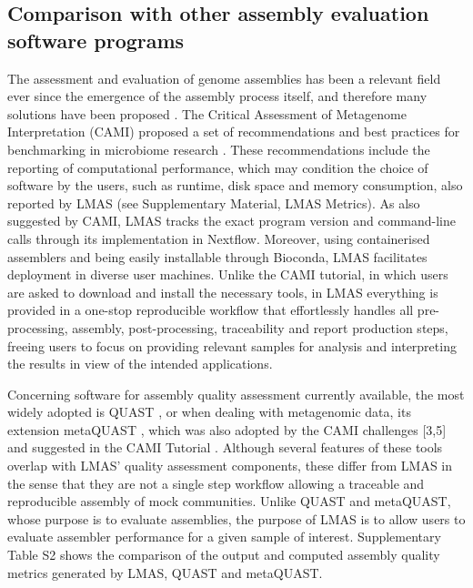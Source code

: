\subsection{Comparison with other assembly evaluation software programs}

The assessment and evaluation of genome assemblies has been a relevant field ever since the emergence of the assembly process itself, and therefore many solutions have been proposed \cite{sczyrba_critical_2017, olson_metagenomic_2019, bradnam_assemblathon_2013, gurevich_quast_2013, mikheenko_metaquast_2016, manchanda_genomeqc_2020, meader_genome_2010, challis_blobtoolkit_2020}. The Critical Assessment of Metagenome Interpretation (CAMI) proposed a set of recommendations and best practices for benchmarking in microbiome research \cite{meyer_tutorial_2021}. These recommendations include the reporting of computational performance, which may condition the choice of software by the users, such as runtime, disk space and memory consumption, also reported by  LMAS (see Supplementary Material, LMAS Metrics). As also suggested by CAMI, LMAS tracks the exact program version and command-line calls through its implementation in Nextflow. Moreover,  using containerised assemblers and being easily installable through Bioconda, LMAS facilitates deployment in diverse user machines. Unlike the CAMI tutorial, in which users are asked to download and install the necessary tools, in LMAS everything is provided in a one-stop reproducible workflow that effortlessly handles all pre-processing, assembly, post-processing, traceability and report production steps, freeing users to focus on providing relevant samples for analysis and interpreting the results in view of the intended applications.

Concerning software for assembly quality assessment currently available, the most widely adopted is QUAST \cite{gurevich_quast_2013}, or when dealing with metagenomic data, its extension metaQUAST \cite{mikheenko_metaquast_2016}, which was also adopted by the CAMI challenges [3,5] \cite{sczyrba_critical_2017, meyer_critical_2021} and suggested in the CAMI Tutorial \cite{meyer_tutorial_2021}. Although several features of these tools overlap with LMAS’ quality assessment components, these differ from LMAS in the sense that they are not a single step workflow allowing a traceable and reproducible assembly of mock communities. Unlike QUAST and metaQUAST, whose purpose is to evaluate assemblies, the purpose of LMAS is to allow users to evaluate assembler performance for a given sample of interest. Supplementary Table S2 shows the comparison of the output and computed assembly quality metrics generated by LMAS, QUAST and metaQUAST. 


